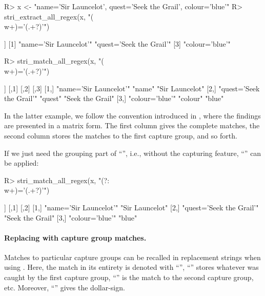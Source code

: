 \documentclass[nojss]{jss}\usepackage[]{graphicx}\usepackage[]{color}
\newcommand{\str}[1]{\code{{#1}}}
\begin{document}
\begin{Schunk}
\begin{Sinput}
R> x <- "name='Sir Launcelot', quest='Seek the Grail', colour='blue'"
R> stri_extract_all_regex(x, "(\\w+)='(.+?)'")
\end{Sinput}
\begin{Soutput}
[[1]]
[1] "name='Sir Launcelot'"   "quest='Seek the Grail'"
[3] "colour='blue'"
\end{Soutput}
\begin{Sinput}
R> stri_match_all_regex(x, "(\\w+)='(.+?)'")
\end{Sinput}
\begin{Soutput}
[[1]]
     [,1]                     [,2]     [,3]
[1,] "name='Sir Launcelot'"   "name"   "Sir Launcelot"
[2,] "quest='Seek the Grail'" "quest"  "Seek the Grail"
[3,] "colour='blue'"          "colour" "blue"
\end{Soutput}
\end{Schunk}

In the latter example, we follow the convention introduced in ,
where the findings are presented in a matrix form. The first column
gives the complete matches, the second column stores the matches to the
first capture group, and so forth.

If we just need the grouping part of ``'', i.e.,
without the capturing feature,
``'' can be applied:

\begin{Schunk}
\begin{Sinput}
R> stri_match_all_regex(x, "(?:\\w+)='(.+?)'")
\end{Sinput}
\begin{Soutput}
[[1]]
     [,1]                     [,2]
[1,] "name='Sir Launcelot'"   "Sir Launcelot"
[2,] "quest='Seek the Grail'" "Seek the Grail"
[3,] "colour='blue'"          "blue"
\end{Soutput}
\end{Schunk}


\paragraph{Replacing with capture group matches.}
Matches to particular capture groups can be recalled in replacement strings
when using .
Here, the match in its entirety is denoted with ``\str{\$0}'',
``\str{\$1}'' stores whatever was caught by the first capture group,
``\str{\$2}'' is the match to the second capture group, etc.
Moreover, ``\str{\textbackslash{}\$}'' gives the dollar-sign.
\end{document}

